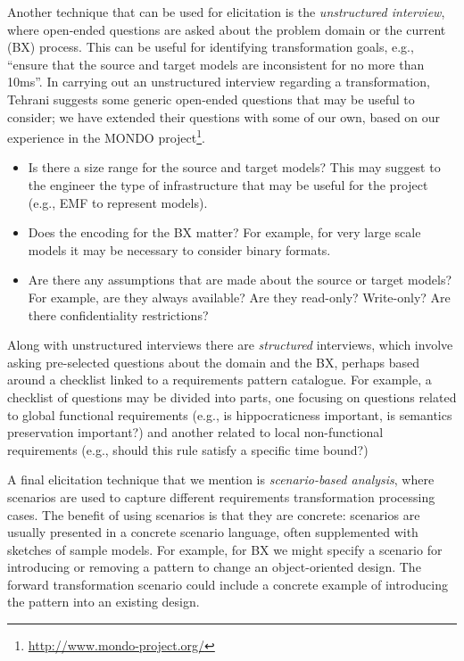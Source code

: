 Another technique that can be used for elicitation is the \textit{unstructured interview}, where open-ended questions are asked about the problem domain or the current (BX) process. This can be useful for identifying transformation goals, e.g., ``ensure that the source and target models are inconsistent for no more than 10ms''. In carrying out an unstructured interview regarding a transformation, Tehrani \cite{TehraniZL16} suggests some generic open-ended questions that may be useful to consider; we have extended their questions with some of our own, based on our experience in the MONDO project\footnote{\url{http://www.mondo-project.org/}}.
\begin{itemize}
\item Is there a size range for the source and target models? This may suggest to the engineer the type of infrastructure that may be useful for the project (e.g., EMF to represent models).

\item Does the encoding for the BX matter? For example, for very large scale models it may be necessary to consider binary formats.

\item Are there any assumptions that are made about the source or target models? For example, are they always available? Are they read-only? Write-only? Are there confidentiality restrictions?
\end{itemize}
Along with unstructured interviews there are \textit{structured} interviews, which involve asking pre-selected questions about the domain and the BX, perhaps based around a checklist linked to a requirements pattern catalogue. For example, a checklist of questions may be divided into parts, one focusing on questions related to global functional requirements (e.g., is hippocraticness important, is semantics preservation important?) and another related to local non-functional requirements (e.g., should this rule satisfy a specific time bound?)

A final elicitation technique that we mention is \textit{scenario-based analysis}, where scenarios are used to capture different requirements transformation processing cases. The benefit of using scenarios is that they are concrete: scenarios are usually presented in a concrete scenario language, often supplemented with sketches of sample models. For example, for BX we might specify a scenario for introducing or removing a pattern to change an object-oriented design. The forward transformation scenario could include a concrete example of introducing the pattern into an existing design.

